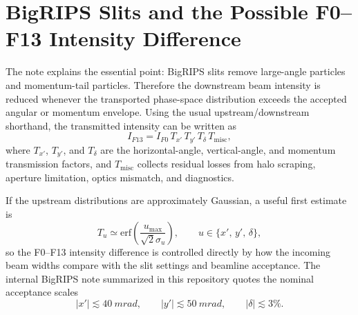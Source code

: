 \documentclass[11pt,a4paper]{article}
\begin{document}
\section{BigRIPS Slits and the Possible F0--F13 Intensity Difference}

The note  explains the essential point: BigRIPS slits remove large-angle particles and momentum-tail particles. Therefore the downstream beam intensity is reduced whenever the transported phase-space distribution exceeds the accepted angular or momentum envelope. Using the usual upstream/downstream shorthand, the transmitted intensity can be written as
\begin{equation}
\label{eq:f0_f13_transport}
    I_{F13} = I_{F0}\,T_{x'}\,T_{y'}\,T_{\delta}\,T_{\mathrm{misc}},
\end{equation}
where $T_{x'}$, $T_{y'}$, and $T_{\delta}$ are the horizontal-angle, vertical-angle, and momentum transmission factors, and $T_{\mathrm{misc}}$ collects residual losses from halo scraping, aperture limitation, optics mismatch, and diagnostics.

If the upstream distributions are approximately Gaussian, a useful first estimate is
\begin{equation}
\label{eq:gaussian_transmission}
    T_{u} \simeq \mathrm{erf}\!\left(\frac{u_{\max}}{\sqrt{2}\sigma_u}\right),
    \qquad
    u \in \{x',\,y',\,\delta\},
\end{equation}
so the F0--F13 intensity difference is controlled directly by how the incoming beam widths compare with the slit settings and beamline acceptance. The internal BigRIPS note summarized in this repository quotes the nominal acceptance scales
\begin{equation}
    |x'| \lesssim \SI{40}{mrad},
    \qquad
    |y'| \lesssim \SI{50}{mrad},
    \qquad
    |\delta| \lesssim 3\%.
\end{equation}
\end{document}
